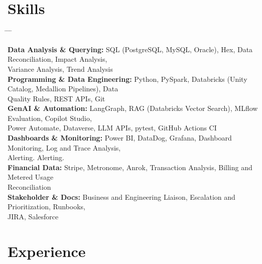 \documentclass[10pt, letterpaper]{article}
\begin{document}
    \section{Skills}
        \begin{tabbing}
    \hspace{5.8cm} \= \hspace{4cm} \= \hspace{4cm} \= \kill %

    \textbf{Data Analysis \& Querying:} \> SQL (PostgreSQL, MySQL, Oracle), Hex, Data Reconciliation, Impact Analysis,\\ \> Variance Analysis, Trend Analysis\\

    \textbf{Programming \& Data Engineering:} \> Python, PySpark, Databricks (Unity Catalog, Medallion Pipelines), Data\\ \> Quality Rules, REST APIs, Git\\

    \textbf{GenAI \& Automation:} \> LangGraph, RAG (Databricks Vector Search), MLflow Evaluation, Copilot Studio,\\ \> Power Automate, Dataverse, LLM APIs, pytest, GitHub Actions CI\\

    \textbf{Dashboards \& Monitoring:} \> Power BI, DataDog, Grafana, Dashboard Monitoring, Log and Trace Analysis,\\ \> Alerting. Alerting.\\

    \textbf{Financial Data:} \> Stripe, Metronome, Anrok, Transaction Analysis, Billing and Metered Usage\\ \> Reconciliation\\

    \textbf{Stakeholder \& Docs:} \> Business and Engineering Liaison, Escalation and Prioritization, Runbooks,\\ \> JIRA, Salesforce
\end{tabbing}

    \section{Experience}
\end{document}
